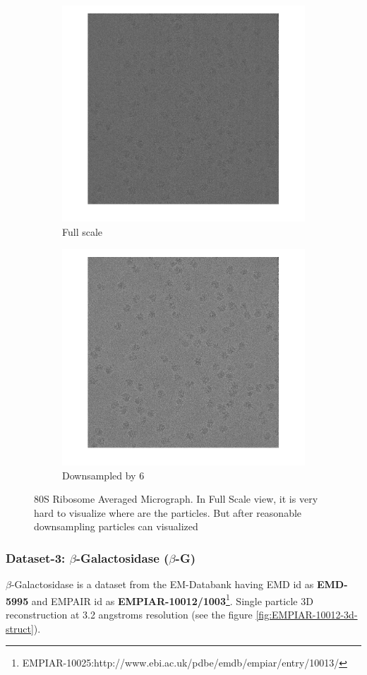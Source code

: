 \documentclass{report}
\begin{document}
\begin{figure}[h]
\centering
\begin{subfigure}{.5\linewidth}
\centering
\includegraphics[width=0.5\linewidth]{EM-10028-micrograph-full_micrograph}
\captionsetup{justification=centering}
\caption{ Full scale }
\end{subfigure} 
\begin{subfigure}{.48\linewidth}
\centering
\includegraphics[width=0.5\linewidth]{EM-10028-micrograph-full-down-6_micrograph}
\captionsetup{justification=centering}
\caption{Downsampled by 6}
\end{subfigure}
\caption{80S Ribosome Averaged Micrograph. In Full Scale view, it is very hard to visualize where are the particles. But after reasonable downsampling particles can  visualized}
\label{fig:EM-10028-Avg-micrograph}
\end{figure}


\subsubsection{Dataset-3: $\beta$-Galactosidase ($\beta$-G)}\label{subsec:B-Galactosidas}

$\beta$-Galactosidase is a dataset from the EM-Databank having EMD id as \textbf{EMD-5995} and EMPAIR id as \textbf{EMPIAR-10012/1003}\footnote{\label{fn:EMPIAR-10025-2}EMPIAR-10025:http://www.ebi.ac.uk/pdbe/emdb/empiar/entry/10013/}. Single particle 3D reconstruction at 3.2 angstroms resolution (see the figure \ref{fig:EMPIAR-10012-3d-struct}).
\end{document}
